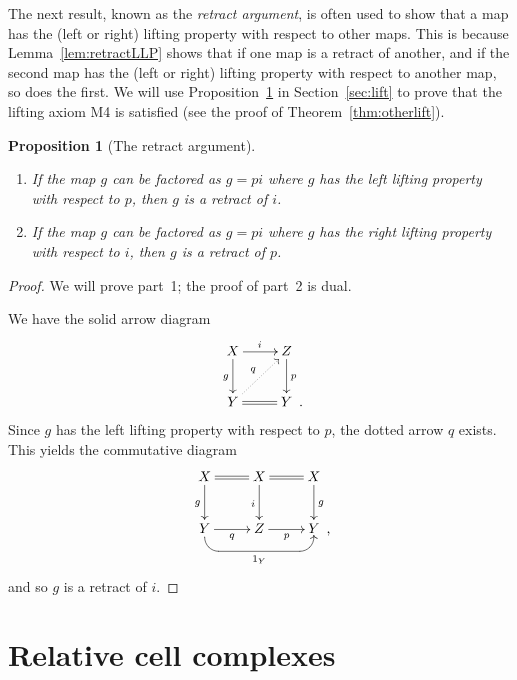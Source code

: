 \documentclass[12pt]{amsart}
\numberwithin{equation}{section}
\theoremstyle{slplain}
\newtheorem{prop}[equation]{Proposition}
\theoremstyle{definition}
\theoremstyle{remark}
\newcommand{\thmref}{Theorem~\ref}
\newcommand{\propref}{Proposition~\ref}
\newcommand{\lemref}{Lemma~\ref}
\newcommand{\secref}{Section~\ref}
\newcommand{\Comma}{\rlap{\enspace ,}}
\newcommand{\Period}{\rlap{\enspace .}}
\begin{document}
The next result, known as the \emph{retract argument}, is often used
to show that a map has the (left or right) lifting property with
respect to other maps.  This is because \lemref{lem:retractLLP} shows
that if one map is a retract of another, and if the second map has the
(left or right) lifting property with respect to another map, so does
the first.  We will use \propref{prop:RetArg} in \secref{sec:lift} to
prove that the lifting axiom M4 is satisfied (see the proof of
\thmref{thm:otherlift}).
\begin{prop}[The retract argument]
  \label{prop:RetArg}
\leavevmode
  \begin{enumerate}
  \item If the map $g$ can be factored as $g = pi$ where $g$ has the
    left lifting property with respect to $p$, then $g$ is a retract
    of $i$.
  \item If the map $g$ can be factored as $g = pi$ where $g$ has the
    right lifting property with respect to $i$, then $g$ is a retract
    of $p$.
  \end{enumerate}
\end{prop}

\begin{proof}
  We will prove part~1; the proof of part~2 is dual.

  We have the solid arrow diagram
  \begin{displaymath}
    \xymatrix{
      {X} \ar[r]^{i} \ar[d]_{g}
        & {Z} \ar[d]^{p}\\
      {Y} \ar@{.>}[ur]^{q} \ar@{=}[r]
        & {Y \Period}
    }
  \end{displaymath}
  Since $g$ has the left lifting property with respect to $p$, the
  dotted arrow $q$ exists.  This yields the commutative diagram
  \begin{displaymath}
    \xymatrix{
      {X} \ar@{=}[r] \ar[d]_{g}
        & {X} \ar@{=}[r] \ar[d]_{i}
        & {X} \ar[d]^{g}\\
        {Y} \ar[r]_{q} \ar `d[rr] `[urr]_{1_{Y}} [rr]+<0ex,-1ex>
        & {Z} \ar[r]_{p}
        & {Y \smash{\Comma}}
    }
  \end{displaymath}
  and so $g$ is a retract of $i$.
\end{proof}

\section{Relative cell complexes}
\label{sec:RelClCmp}
\end{document}
